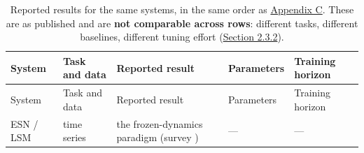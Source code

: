 \documentclass[a4paper,fleqn]{cas-sc}
\begin{document}
\begin{longtable}[]{@{}
  >{\raggedright\arraybackslash}p{}
  >{\raggedright\arraybackslash}p{}
  >{\raggedright\arraybackslash}p{}
  >{\raggedright\arraybackslash}p{}
  >{\raggedright\arraybackslash}p{}@{}}
\caption{Reported results for the same systems, in the same order as
\hyperref[sec-C]{Appendix C}. These are as published and are \textbf{not
comparable across rows}: different tasks, different baselines, different
tuning effort (\hyperref[sec-2-3-2]{Section 2.3.2}).}\tabularnewline
\toprule\noalign{}
\begin{minipage}[b]{\linewidth}\raggedright
System
\end{minipage} & \begin{minipage}[b]{\linewidth}\raggedright
Task and data
\end{minipage} & \begin{minipage}[b]{\linewidth}\raggedright
Reported result
\end{minipage} & \begin{minipage}[b]{\linewidth}\raggedright
Parameters
\end{minipage} & \begin{minipage}[b]{\linewidth}\raggedright
Training horizon
\end{minipage} \\
\midrule\noalign{}
\endfirsthead
\toprule\noalign{}
\begin{minipage}[b]{\linewidth}\raggedright
System
\end{minipage} & \begin{minipage}[b]{\linewidth}\raggedright
Task and data
\end{minipage} & \begin{minipage}[b]{\linewidth}\raggedright
Reported result
\end{minipage} & \begin{minipage}[b]{\linewidth}\raggedright
Parameters
\end{minipage} & \begin{minipage}[b]{\linewidth}\raggedright
Training horizon
\end{minipage} \\
\midrule\noalign{}
\endhead
\bottomrule\noalign{}
\endlastfoot
ESN / LSM & time series & the frozen-dynamics paradigm (survey
\citep{lukosevicius2009}) & --- & --- \\

\end{longtable}
\end{document}
